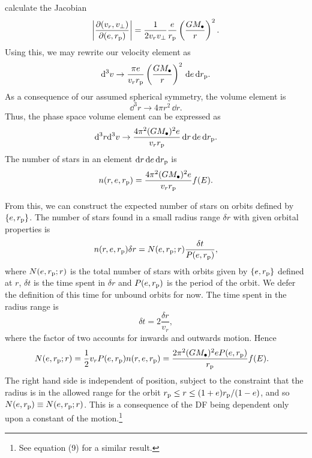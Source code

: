 calculate the Jacobian
\begin{equation}
\left|\dfrac{\partial(v_r, v_\perp)}{\partial(e, r_\mathrm{p})}\right| = \dfrac{1}{2v_rv_\perp}\dfrac{e}{r_\mathrm{p}}\left(\dfrac{GM_\bullet}{r}\right)^2.
\end{equation}
Using this, we may
rewrite our velocity element as
\begin{equation}
\mathrm{d}^3v \rightarrow \dfrac{\pi e}{v_r r_\mathrm{p}}\left(\dfrac{GM_\bullet}{r}\right)^2\,\mathrm{d} e \,\mathrm{d} r_\mathrm{p}.
\end{equation}
As a consequence of our assumed spherical symmetry, 
the volume element is
\begin{equation}
\dd^3r \rightarrow 4\pi r^2 \,\dd r.
\end{equation}
Thus, 
the phase space volume element can be expressed as
\begin{equation}
\mathrm{d}^3r\mathrm{d}^3v \rightarrow \dfrac{4\pi^2(GM_\bullet)^2e}{v_r r_\mathrm{p}}\,\mathrm{d} r\,\mathrm{d} e \,\mathrm{d} r_\mathrm{p}.
\end{equation}
The number of stars in an element $\mathrm{d} r\,\mathrm{d} e\,\mathrm{d} r_\mathrm{p}$ is
\begin{equation}
n(r, e, r_\mathrm{p}) = \dfrac{4\pi^2(GM_\bullet)^2e}{v_r r_\mathrm{p}}f(E).
\end{equation}

From this, we can construct the expected number of stars on orbits defined by $\{e, r_\mathrm{p}\}$. The number of stars found in a small radius range $\delta r$ with given orbital properties is
\begin{equation}
n(r, e, r_\mathrm{p})\delta r = N(e, r_\mathrm{p}; r)\dfrac{\delta t}{P(e, r_\mathrm{p})},
\end{equation}
where $N(e, r_\mathrm{p}; r)$ is the total number of stars with orbits given by $\{e, r_\mathrm{p}\}$ defined at $r$, $\delta t$ is the time spent in $\delta r$ and $P(e, r_\mathrm{p})$ is the period of the orbit. We defer the definition of this time for unbound orbits for now. The time spent in the radius range is
\begin{equation}
\delta t = 2\dfrac{\delta r}{v_r},
\end{equation}
where the factor of two accounts for inwards and outwards motion. Hence
\begin{align}
N(e, r_\mathrm{p}; r) = {} & \dfrac{1}{2} v_r P(e, r_\mathrm{p}) n(r, e, r_\mathrm{p}) = \dfrac{2\pi^2(GM_\bullet)^2 e P(e, r_\mathrm{p})}{r_\mathrm{p}}f(E).
\end{align}
The right hand side is independent of position, subject to the constraint that the radius is in the allowed range for the orbit $r_\mathrm{p} \leq r \leq (1+e)r_\mathrm{p}/(1-e)$, and so $N(e, r_\mathrm{p}) \equiv N(e, r_\mathrm{p}; r)$. This is a consequence of the DF being dependent only upon a constant of the motion.\footnote{See \citet{Bahcall1976} equation (9) for a similar result.}

